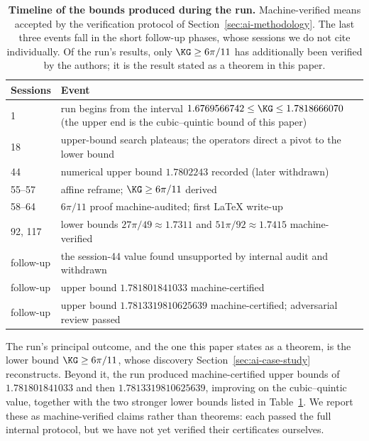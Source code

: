\begin{table}[t]
\centering
\small
\begin{tabular}{@{}lp{}@{}}
\toprule
Sessions & Event\\
\midrule
1 & run begins from the interval $1.6769566742\le\KG\le1.7818666070$
(the upper end is the cubic--quintic bound of this paper)\\
18 & upper-bound search plateaus; the operators direct a pivot to the
lower bound\\
44 & numerical upper bound $1.7802243$ recorded (later withdrawn)\\
55--57 & affine reframe; $\KG\ge6\pi/11$ derived\\
58--64 & $6\pi/11$ proof machine-audited; first \LaTeX{} write-up\\
92, 117 & lower bounds $27\pi/49\approx1.7311$ and
$51\pi/92\approx1.7415$ machine-verified\\
follow-up & the session-44 value found unsupported by internal audit and
withdrawn\\
follow-up & upper bound $1.781801841033$ machine-certified\\
follow-up & upper bound $1.7813319810625639$ machine-certified;
adversarial review passed\\
\bottomrule
\end{tabular}
\caption{\textbf{Timeline of the bounds produced during the run.}
Machine-verified means accepted by the verification protocol of
Section~\ref{sec:ai-methodology}. The last three events fall in the short
follow-up phases, whose sessions we do not cite individually. Of the
run's results, only $\KG\ge6\pi/11$ has additionally been verified by the
authors; it is the result stated as a theorem in this paper.}
\label{tab:timeline}
\end{table}

The run's principal outcome, and the one this paper states as a theorem,
is the lower bound $\KG\ge6\pi/11$, whose discovery
Section~\ref{sec:ai-case-study} reconstructs. Beyond it, the run produced
machine-certified upper bounds of $1.781801841033$ and then
$1.7813319810625639$, improving on the cubic--quintic value, together with
the two stronger lower bounds listed in Table~\ref{tab:timeline}. We
report these as machine-verified claims rather than theorems: each passed
the full internal protocol, but we have not yet verified their
certificates ourselves.

